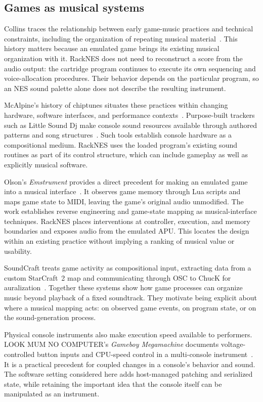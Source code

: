 \documentclass[10pt,letterpaper,twocolumn]{article}
\begin{document}
\subsection{Games as musical systems}
Collins traces the relationship between early game-music practices and
technical constraints, including the organization of repeating musical
material~\cite{collins2007}. This history matters because an emulated game
brings its existing musical organization with it. RackNES does not need to
reconstruct a score from the audio output: the cartridge program continues
to execute its own sequencing and voice-allocation procedures. Their behavior
depends on the particular program, so an NES sound palette alone does not
describe the resulting instrument.

McAlpine's history of chiptunes situates these practices within changing
hardware, software interfaces, and performance contexts~\cite{mcalpine2018}.
Purpose-built trackers such as Little Sound Dj make console sound resources
available through authored patterns and song structures~\cite{lsdj}. Such
tools establish console hardware as a compositional medium. RackNES uses
the loaded program's existing sound routines as part of its control
structure, which can include gameplay as well as explicitly musical software.

Olson's \emph{Emstrument} provides a direct precedent for making an emulated
game into a musical interface~\cite{olson2016}. It observes game memory through
Lua scripts and maps game state to MIDI, leaving the game's original audio
unmodified. The work establishes reverse engineering and game-state mapping
as musical-interface techniques. RackNES places interventions at controller,
execution, and memory boundaries and exposes audio from the emulated APU.
This locates the design within an existing practice without implying a ranking
of musical value or usability.

SoundCraft treats game activity as compositional input, extracting data from
a custom StarCraft~2 map and communicating through OSC to ChucK for
auralization~\cite{soundcraft2013}. Together these systems show how game
processes can organize music beyond playback of a fixed soundtrack. They
motivate being explicit about where a musical mapping acts: on observed game
events, on program state, or on the sound-generation process.

Physical console instruments also make execution speed available to performers.
LOOK MUM NO COMPUTER's \emph{Gameboy Megamachine} documents voltage-controlled
button inputs and CPU-speed control in a multi-console instrument~\cite{megamachine}.
It is a practical precedent for coupled changes in a console's behavior and
sound. The software setting considered here adds host-managed patching and
serialized state, while retaining the important idea that the console itself
can be manipulated as an instrument.
\end{document}

